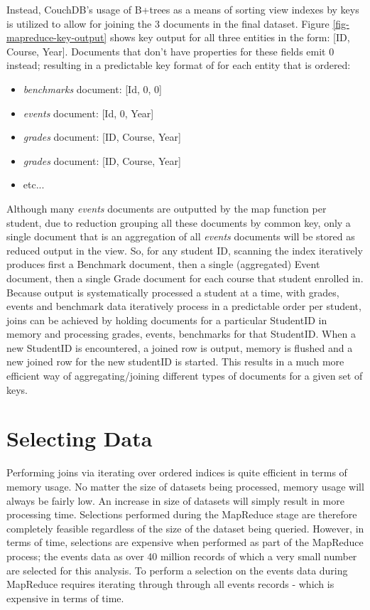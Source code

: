 Instead, CouchDB's usage of B+trees as a means of sorting view indexes by keys is utilized to allow for joining the 3 documents in the final dataset. Figure \ref{fig-mapreduce-key-output} shows key output for all three entities in the form: [ID, Course, Year]. Documents that don't have properties for these fields emit 0 instead; resulting in a predictable key format of for each entity that is ordered:

\begin{itemize}
    \item \textit{benchmarks} document: [Id, 0, 0]
    \item \textit{events} document: [Id, 0, Year]
    \item \textit{grades} document: [ID, Course, Year]
    \item \textit{grades} document: [ID, Course, Year]
    \item etc...
\end{itemize}

Although many \textit{events} documents are outputted by the map function per student, due to reduction grouping all these documents by common key, only a single document that is an aggregation of all \textit{events} documents will be stored as reduced output in the view. So, for any student ID, scanning the index iteratively produces first a Benchmark document, then a single (aggregated) Event document, then a single Grade document for each course that student enrolled in. Because output is systematically processed a student at a time, with grades, events and benchmark data iteratively process in a predictable order per student, joins can be achieved by holding documents for a particular StudentID in memory and processing grades, events, benchmarks for that StudentID. When a new StudentID is encountered, a joined row is output, memory is flushed and a new joined row for the new studentID is started. This results in a much more efficient way of aggregating/joining different types of documents for a given set of keys.



\section{Selecting Data}
Performing joins via iterating over ordered indices is quite efficient in terms of memory usage. No matter the size of datasets being processed, memory usage will always be fairly low. An increase in size of datasets will simply result in more processing time. Selections performed during the MapReduce stage are therefore completely feasible regardless of the size of the dataset being queried. However, in terms of time, selections are expensive when performed as part of the MapReduce process; the events data as over 40 million records of which a very small number are selected for this analysis. To perform a selection on the events data during MapReduce requires iterating through through all events records - which is expensive in terms of time.

